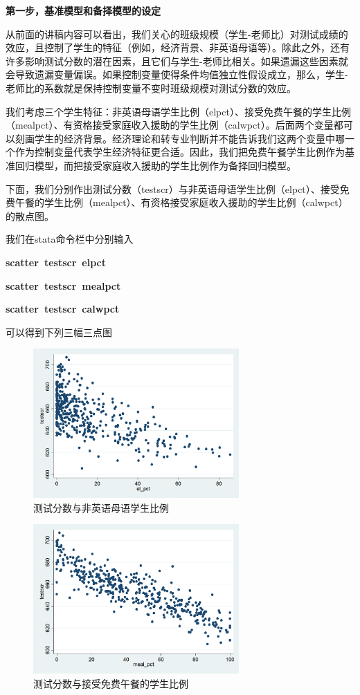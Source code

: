 \documentclass[cn,12pt,math=newtx,citestyle=gb7714-2015,bibstyle=gb7714-2015]{elegantbook}
\begin{document}
	\textbf{第一步，基准模型和备择模型的设定}
	
	从前面的讲稿内容可以看出，我们关心的班级规模（学生-老师比）对测试成绩的效应，且控制了学生的特征（例如，经济背景、非英语母语等）。除此之外，还有许多影响测试分数的潜在因素，且它们与学生-老师比相关。如果遗漏这些因素就会导致遗漏变量偏误。如果控制变量使得条件均值独立性假设成立，那么，学生-老师比的系数就是保持控制变量不变时班级规模对测试分数的效应。
	
	我们考虑三个学生特征：非英语母语学生比例（elpct）、接受免费午餐的学生比例（mealpct）、有资格接受家庭收入援助的学生比例（calwpct）。后面两个变量都可以刻画学生的经济背景。经济理论和转专业判断并不能告诉我们这两个变量中哪一个作为控制变量代表学生经济特征更合适。因此，我们把免费午餐学生比例作为基准回归模型，而把接受家庭收入援助的学生比例作为备择回归模型。
	
	下面，我们分别作出测试分数（testscr）与非英语母语学生比例（elpct）、接受免费午餐的学生比例（mealpct）、有资格接受家庭收入援助的学生比例（calwpct）的散点图。
	
	我们在stata命令栏中分别输入
	
	\textbf{ scatter~testscr~elpct}
	
	\textbf{ scatter~testscr~mealpct}
	
	\textbf{ scatter~testscr~calwpct}
	
	可以得到下列三幅三点图
	\begin{figure}[htbp]
		\centering
		\includegraphics[width=0.7\textwidth]{elr.png}
		\caption{测试分数与非英语母语学生比例}\label{fig:digit}
	\end{figure}
	
	\begin{figure}[htbp]
		\centering
		\includegraphics[width=0.7\textwidth]{lunch.png}
		\caption{测试分数与接受免费午餐的学生比例}\label{fig:digit}
	\end{figure}
	
\end{document}
